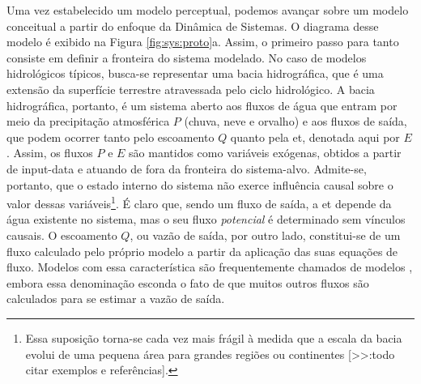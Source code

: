 \documentclass[./main.tex]{subfiles}
\begin{document}
\par Uma vez estabelecido um modelo perceptual, podemos avançar sobre um modelo conceitual a partir do enfoque da Dinâmica de Sistemas. O diagrama desse modelo é exibido na Figura \ref{fig:sys:proto}a. Assim, o primeiro passo para tanto consiste em definir a fronteira do sistema modelado. No caso de modelos hidrológicos típicos, busca-se representar uma bacia hidrográfica, que é uma extensão da superfície terrestre atravessada pelo ciclo hidrológico. A bacia hidrográfica, portanto, é um sistema aberto aos fluxos de água que entram por meio da precipitação atmosférica $P$ (chuva, neve e orvalho) e aos fluxos de saída, que podem ocorrer tanto pelo escoamento $Q$ quanto pela \acrlong{et}, denotada aqui por $E$. Assim, os fluxos $P$ e $E$ são mantidos como variáveis exógenas, obtidos a partir de \gls{input-data} e atuando de fora da fronteira do sistema-alvo. Admite-se, portanto, que o estado interno do sistema não exerce influência causal sobre o valor dessas variáveis\footnote{Essa suposição torna-se cada vez mais frágil à medida que a escala da bacia evolui de uma pequena área para grandes regiões ou continentes [>>:todo citar exemplos e referências].}. É claro que, sendo um fluxo de saída, a \acrlong{et} depende da água existente no sistema, mas o seu fluxo \textit{potencial} é determinado sem vínculos causais. O escoamento $Q$, ou vazão de saída, por outro lado, constitui-se de um fluxo calculado pelo próprio modelo a partir da aplicação das suas equações de fluxo. Modelos com essa característica são frequentemente chamados de modelos , embora essa denominação esconda o fato de que muitos outros fluxos são calculados para se estimar a vazão de saída.
\end{document}
